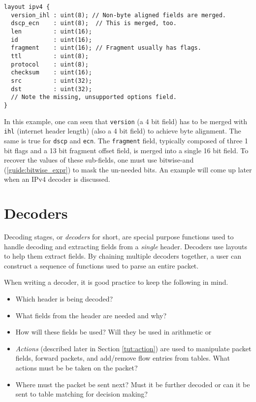 \begin{codepage}
\begin{lstlisting}
layout ipv4 {
  version_ihl : uint(8); // Non-byte aligned fields are merged.
  dscp_ecn    : uint(8);  // This is merged, too.
  len         : uint(16);
  id          : uint(16);
  fragment    : uint(16); // Fragment usually has flags.
  ttl         : uint(8);
  protocol    : uint(8);
  checksum    : uint(16);
  src         : uint(32);
  dst         : uint(32);
  // Note the missing, unsupported options field.
}
\end{lstlisting}
\end{codepage}

In this example, one can seen that \texttt{version} (a 4 bit field) has to be
merged with \texttt{ihl} (internet header length) (also a 4 bit field) to
achieve byte alignment. The same is true for \texttt{dscp} and \texttt{ecn}. The
\texttt{fragment} field, typically composed of three 1 bit flags and a 13 bit
fragment offset field, is merged into a single 16 bit field. To recover the
values of these sub-fields, one must use bitwise-and
(\ref{guide:bitwise_expr}) to mask the un-needed bits. An example will come up
later when an IPv4 decoder is discussed.

\section{Decoders} \label{tut:decoder}

Decoding stages, or \textit{decoders} for short, are special purpose functions
used to handle decoding and extracting fields from a \textit{single} header. Decoders use layouts to help them extract fields. By
chaining multiple decoders together, a user can construct a sequence of
functions used to parse an entire packet. 

When writing a decoder, it is good practice to keep the following in mind.

\begin{itemize}
\item Which header is being decoded?

\item What fields from the header are needed and why?

\item How will these fields be used? Will they be used in arithmetic or 

\item \textit{Actions} (described later in Section \ref{tut:action}) are used to manipulate packet fields, forward packets,
and add/remove flow entries from tables. What actions must be be taken on the packet?

\item Where must the packet be sent next? Must it be further decoded or can it be sent to table matching for decision making?
\end{itemize}

